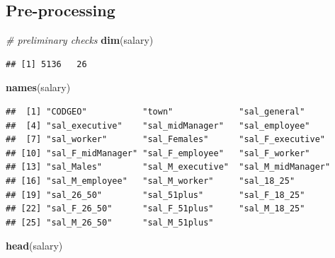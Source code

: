 \documentclass[]{article}
\newenvironment{Shaded}{\begin{snugshade}}{\end{snugshade}}
\newcommand{\KeywordTok}[1]{\textcolor[rgb]{0.13,0.29,0.53}{\textbf{#1}}}
\newcommand{\CommentTok}[1]{\textcolor[rgb]{0.56,0.35,0.01}{\textit{#1}}}
\newcommand{\NormalTok}[1]{#1}
\begin{document}
\subsection{Pre-processing}\label{pre-processing-2}

\begin{Shaded}
\begin{Highlighting}[]
\CommentTok{# preliminary checks}
\KeywordTok{dim}\NormalTok{(salary)}
\end{Highlighting}
\end{Shaded}

\begin{verbatim}
## [1] 5136   26
\end{verbatim}

\begin{Shaded}
\begin{Highlighting}[]
\KeywordTok{names}\NormalTok{(salary)}
\end{Highlighting}
\end{Shaded}

\begin{verbatim}
##  [1] "CODGEO"           "town"             "sal_general"     
##  [4] "sal_executive"    "sal_midManager"   "sal_employee"    
##  [7] "sal_worker"       "sal_Females"      "sal_F_executive" 
## [10] "sal_F_midManager" "sal_F_employee"   "sal_F_worker"    
## [13] "sal_Males"        "sal_M_executive"  "sal_M_midManager"
## [16] "sal_M_employee"   "sal_M_worker"     "sal_18_25"       
## [19] "sal_26_50"        "sal_51plus"       "sal_F_18_25"     
## [22] "sal_F_26_50"      "sal_F_51plus"     "sal_M_18_25"     
## [25] "sal_M_26_50"      "sal_M_51plus"
\end{verbatim}

\begin{Shaded}
\begin{Highlighting}[]
\KeywordTok{head}\NormalTok{(salary)}
\end{Highlighting}
\end{Shaded}
\end{document}
